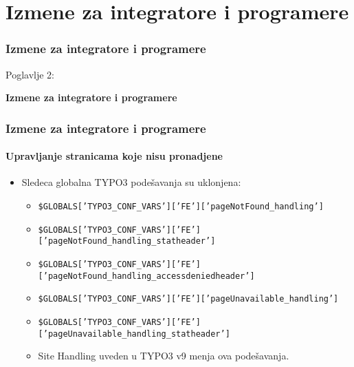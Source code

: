 %

\section{Izmene za integratore i programere}
\begin{frame}[fragile]
	\frametitle{Izmene za integratore i programere}

	\begin{center}\huge{Poglavlje 2:}\end{center}
	\begin{center}\huge{\color{typo3darkgrey}\textbf{Izmene za integratore i programere}}\end{center}

\end{frame}


\begin{frame}[fragile]
	\frametitle{Izmene za integratore i programere}
	\framesubtitle{Upravljanje stranicama koje nisu pronadjene}

	\begin{itemize}

		\item Sledeca globalna TYPO3 podešavanja su uklonjena:

			\begin{itemize}
				\item {\fontsize{7}{8}\selectfont\texttt{\$GLOBALS['TYPO3\_CONF\_VARS']['FE']['pageNotFound\_handling']}}
				\item {\fontsize{7}{8}\selectfont\texttt{\$GLOBALS['TYPO3\_CONF\_VARS']['FE']['pageNotFound\_handling\_statheader']}}
				\item {\fontsize{7}{8}\selectfont\texttt{\$GLOBALS['TYPO3\_CONF\_VARS']['FE']['pageNotFound\_handling\_accessdeniedheader']}}
				\item {\fontsize{7}{8}\selectfont\texttt{\$GLOBALS['TYPO3\_CONF\_VARS']['FE']['pageUnavailable\_handling']}}
				\item {\fontsize{7}{8}\selectfont\texttt{\$GLOBALS['TYPO3\_CONF\_VARS']['FE']['pageUnavailable\_handling\_statheader']}}
			\end{itemize}

			\begin{itemize}\smaller
				\item[\ding{228}] Site Handling uveden u TYPO3 v9 menja ova podešavanja.
			\end{itemize}\normalsize

	\end{itemize}

\end{frame}

